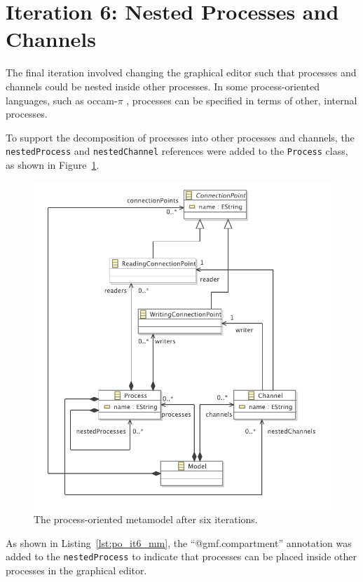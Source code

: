 \section{Iteration 6: Nested Processes and Channels}
The final iteration involved changing the graphical editor such that processes and channels could be nested inside other processes. In some process-oriented languages, such as occam-$\pi$ \cite{occam_pi}, processes can be specified in terms of other, internal processes.

To support the decomposition of processes into other processes and channels, the \texttt{ne\-st\-edPr\-oc\-e\-ss} and \texttt{ne\-st\-edCh\-an\-n\-el} references were added to the \texttt{Pr\-oc\-e\-ss} class, as shown in Figure~\ref{fig:po_it6_mm}. 

\begin{figure}[htbp]
	\centering
		\includegraphics[scale=0.75]{A.2.ProcessOriented/images/6_mm.pdf}
	\caption{The process-oriented metamodel after six iterations.}
	\label{fig:po_it6_mm}
\end{figure}

As shown in Listing~\ref{lst:po_it6_mm}, the ``@gmf.compartment'' annotation was added to the \texttt{ne\-st\-edPr\-oc\-e\-ss} to indicate that processes can be placed inside other processes in the graphical editor.

